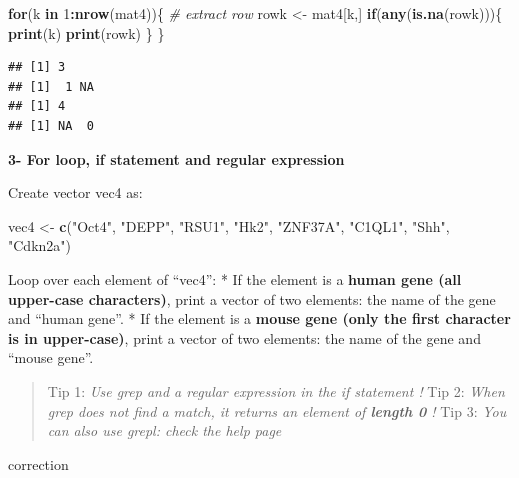 \documentclass[]{book}
\newenvironment{Shaded}{\begin{snugshade}}{\end{snugshade}}
\newcommand{\CommentTok}[1]{\textcolor[rgb]{0.56,0.35,0.01}{\textit{#1}}}
\newcommand{\ControlFlowTok}[1]{\textcolor[rgb]{0.13,0.29,0.53}{\textbf{#1}}}
\newcommand{\DecValTok}[1]{\textcolor[rgb]{0.00,0.00,0.81}{#1}}
\newcommand{\KeywordTok}[1]{\textcolor[rgb]{0.13,0.29,0.53}{\textbf{#1}}}
\newcommand{\NormalTok}[1]{#1}
\newcommand{\OperatorTok}[1]{\textcolor[rgb]{0.81,0.36,0.00}{\textbf{#1}}}
\newcommand{\StringTok}[1]{\textcolor[rgb]{0.31,0.60,0.02}{#1}}
\begin{document}
\begin{Shaded}
\begin{Highlighting}[]
\ControlFlowTok{for}\NormalTok{(k }\ControlFlowTok{in} \DecValTok{1}\OperatorTok{:}\KeywordTok{nrow}\NormalTok{(mat4))\{}
    \CommentTok{# extract row}
\NormalTok{    rowk <-}\StringTok{ }\NormalTok{mat4[k,]}
    \ControlFlowTok{if}\NormalTok{(}\KeywordTok{any}\NormalTok{(}\KeywordTok{is.na}\NormalTok{(rowk)))\{}
        \KeywordTok{print}\NormalTok{(k)}
        \KeywordTok{print}\NormalTok{(rowk)}
\NormalTok{    \}}
\NormalTok{\}}
\end{Highlighting}
\end{Shaded}

\begin{verbatim}
## [1] 3
## [1]  1 NA
## [1] 4
## [1] NA  0
\end{verbatim}

\textbf{3- For loop, if statement and regular expression}

Create vector vec4 as:

\begin{Shaded}
\begin{Highlighting}[]
\NormalTok{vec4 <-}\StringTok{ }\KeywordTok{c}\NormalTok{(}\StringTok{"Oct4"}\NormalTok{, }\StringTok{"DEPP"}\NormalTok{, }\StringTok{"RSU1"}\NormalTok{, }\StringTok{"Hk2"}\NormalTok{, }\StringTok{"ZNF37A"}\NormalTok{, }\StringTok{"C1QL1"}\NormalTok{, }\StringTok{"Shh"}\NormalTok{, }\StringTok{"Cdkn2a"}\NormalTok{)}
\end{Highlighting}
\end{Shaded}

Loop over each element of ``vec4'':
* If the element is a \textbf{human gene (all upper-case characters)}, print a vector of two elements: the name of the gene and ``human gene''.
* If the element is a \textbf{mouse gene (only the first character is in upper-case)}, print a vector of two elements: the name of the gene and ``mouse gene''.

\begin{quote}
Tip 1: \emph{Use grep and a regular expression in the if statement !}
Tip 2: \emph{When grep does not find a match, it returns an element of \textbf{length 0} !}
Tip 3: \emph{You can also use grepl: check the help page}
\end{quote}

correction
\end{document}
